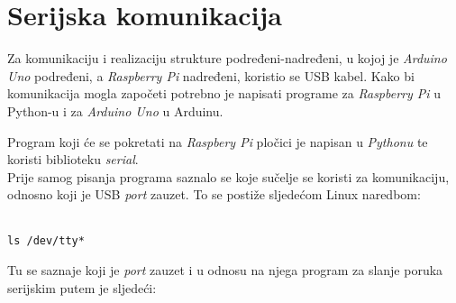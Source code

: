 \section{Serijska komunikacija}

Za komunikaciju i realizaciju strukture podređeni-nadređeni, u kojoj je \textit{Arduino Uno} podređeni, a \textit{Raspberry Pi} nadređeni, koristio se USB kabel. Kako bi komunikacija mogla započeti potrebno je napisati programe za \textit{Raspberry Pi} u Python-u i za \textit{Arduino Uno} u Arduinu.

Program koji će se pokretati na \textit{Raspbery Pi} pločici je napisan u \textit{Pythonu} te koristi biblioteku \textit{serial}.\\

Prije samog pisanja programa saznalo se koje sučelje se koristi za komunikaciju, odnosno koji je USB \textit{port} zauzet. To se postiže sljedećom Linux naredbom:\\
\\
\begin{lstlisting}[caption={Naredba za izlist priključenih uređaja (\textit{Raspberry Pi})}, xleftmargin=.75in, label=program]
ls /dev/tty*
\end{lstlisting}


Tu se saznaje koji je \textit{port} zauzet i u odnosu na njega program za slanje poruka serijskim putem je sljedeći:

